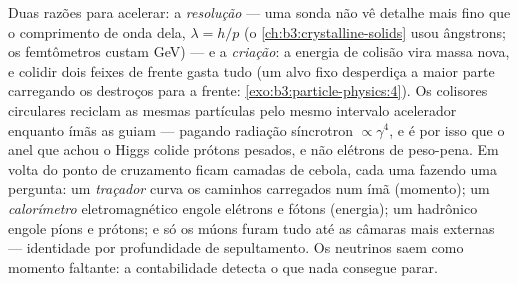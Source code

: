 \begin{remark}\label{rem:b3:particle-physics:machines}
Duas razões para acelerar: a \emph{resolução} --- uma sonda não vê
detalhe mais fino que o comprimento de onda dela, $\lambda = h/p$
(o \cref{ch:b3:crystalline-solids} usou ângstrons; os femtômetros
custam \unit{GeV}) --- e a \emph{criação}: a energia de colisão
vira massa nova, e colidir dois feixes de frente gasta tudo
(um alvo fixo desperdiça a maior parte carregando os destroços para a
frente: \cref{exo:b3:particle-physics:4}). Os colisores circulares
reciclam as mesmas partículas pelo mesmo intervalo acelerador enquanto
ímãs as guiam --- pagando radiação síncrotron
$\propto\gamma^4$, e é por isso que o anel que achou o Higgs
colide prótons pesados, e não elétrons de peso-pena. Em volta do
ponto de cruzamento ficam camadas de cebola, cada uma fazendo uma
pergunta: um \emph{traçador} curva os caminhos carregados num ímã
(momento); um \emph{calorímetro} eletromagnético engole elétrons e
fótons (energia); um hadrônico engole píons e prótons;
e só os múons furam tudo até as câmaras mais externas ---
identidade por profundidade de sepultamento. Os neutrinos saem como
momento faltante: a contabilidade detecta o que nada consegue parar.
\end{remark}

